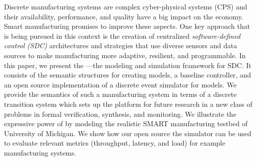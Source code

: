 Discrete manufacturing systems are complex cyber-physical systems (CPS) and their availability, performance, and quality have a big impact on the economy. Smart manufacturing promises to improve these aspects. One key approach that is being pursued in this context is the creation of centralized {\em software-defined control (SDC)} architectures and strategies that use diverse sensors and data sources to make manufacturing more adaptive, resilient, and programmable. In this paper, we present the \mfname---the modeling and simulation framework for SDC. It consists of the semantic  structures for creating models, a baseline controller, and an open source implementation of a discrete event simulator for \mfname models. We provide the semantics of such a manufacturing system in terms of a discrete transition system which sets up the platform for future research in a new class of problems in formal verification, synthesis, and monitoring. We illustrate the expressive power of \mfname by modeling the realistic SMART manufacturing testbed of University of Michigan. We show how our open source the \mfname simulator can be used to evaluate relevant metrics (throughput, latency, and load) for example manufacturing systems.